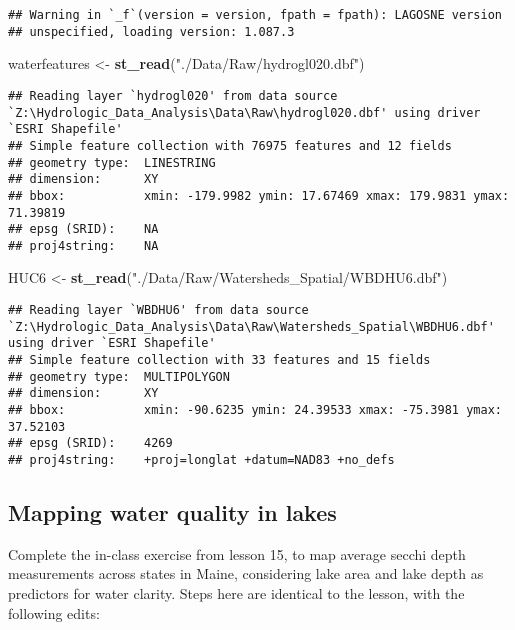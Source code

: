 \documentclass[]{article}
\newenvironment{Shaded}{\begin{snugshade}}{\end{snugshade}}
\newcommand{\KeywordTok}[1]{\textcolor[rgb]{0.13,0.29,0.53}{\textbf{#1}}}
\newcommand{\NormalTok}[1]{#1}
\newcommand{\StringTok}[1]{\textcolor[rgb]{0.31,0.60,0.02}{#1}}
\begin{document}
\begin{verbatim}
## Warning in `_f`(version = version, fpath = fpath): LAGOSNE version
## unspecified, loading version: 1.087.3
\end{verbatim}

\begin{Shaded}
\begin{Highlighting}[]
\NormalTok{waterfeatures <-}\StringTok{ }\KeywordTok{st_read}\NormalTok{(}\StringTok{"./Data/Raw/hydrogl020.dbf"}\NormalTok{)}
\end{Highlighting}
\end{Shaded}

\begin{verbatim}
## Reading layer `hydrogl020' from data source `Z:\Hydrologic_Data_Analysis\Data\Raw\hydrogl020.dbf' using driver `ESRI Shapefile'
## Simple feature collection with 76975 features and 12 fields
## geometry type:  LINESTRING
## dimension:      XY
## bbox:           xmin: -179.9982 ymin: 17.67469 xmax: 179.9831 ymax: 71.39819
## epsg (SRID):    NA
## proj4string:    NA
\end{verbatim}

\begin{Shaded}
\begin{Highlighting}[]
\NormalTok{HUC6 <-}\StringTok{ }\KeywordTok{st_read}\NormalTok{(}\StringTok{"./Data/Raw/Watersheds_Spatial/WBDHU6.dbf"}\NormalTok{)}
\end{Highlighting}
\end{Shaded}

\begin{verbatim}
## Reading layer `WBDHU6' from data source `Z:\Hydrologic_Data_Analysis\Data\Raw\Watersheds_Spatial\WBDHU6.dbf' using driver `ESRI Shapefile'
## Simple feature collection with 33 features and 15 fields
## geometry type:  MULTIPOLYGON
## dimension:      XY
## bbox:           xmin: -90.6235 ymin: 24.39533 xmax: -75.3981 ymax: 37.52103
## epsg (SRID):    4269
## proj4string:    +proj=longlat +datum=NAD83 +no_defs
\end{verbatim}

\hypertarget{mapping-water-quality-in-lakes}{%
\subsection{Mapping water quality in
lakes}\label{mapping-water-quality-in-lakes}}

Complete the in-class exercise from lesson 15, to map average secchi
depth measurements across states in Maine, considering lake area and
lake depth as predictors for water clarity. Steps here are identical to
the lesson, with the following edits:
\end{document}
